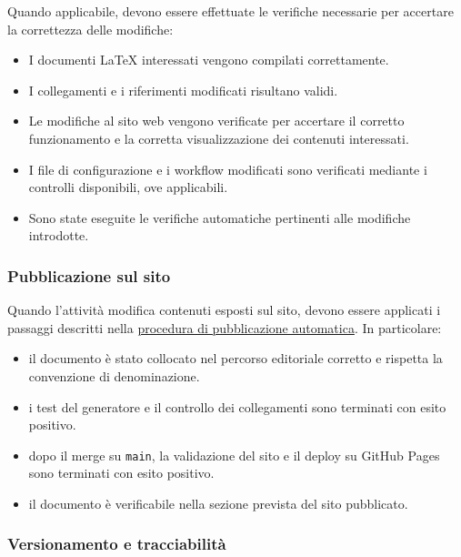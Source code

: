 \documentclass[11pt, a4paper]{article}
\begin{document}
Quando applicabile, devono essere effettuate le verifiche necessarie per accertare la correttezza delle modifiche:

\begin{itemize}
    \item I documenti LaTeX interessati vengono compilati correttamente.
    \item I collegamenti e i riferimenti modificati risultano validi.
    \item Le modifiche al sito web vengono verificate per accertare il corretto funzionamento e la corretta visualizzazione dei contenuti interessati.
    \item I file di configurazione e i workflow modificati sono verificati mediante i controlli disponibili, ove applicabili.
    \item Sono state eseguite le verifiche automatiche pertinenti alle modifiche introdotte.
\end{itemize}

\subsubsection{Pubblicazione sul sito}

Quando l'attività modifica contenuti esposti sul sito, devono essere applicati i passaggi descritti nella \hyperref[sec:pubblicazione-automatica]{procedura di pubblicazione automatica}. In particolare:
\begin{itemize}
    \item il documento è stato collocato nel percorso editoriale corretto e rispetta la convenzione di denominazione.
    \item i test del generatore e il controllo dei collegamenti sono terminati con esito positivo.
    \item dopo il merge su \texttt{main}, la validazione del sito e il deploy su GitHub Pages sono terminati con esito positivo.
    \item il documento è verificabile nella sezione prevista del sito pubblicato.
\end{itemize}

\subsubsection{Versionamento e tracciabilità}
\end{document}
